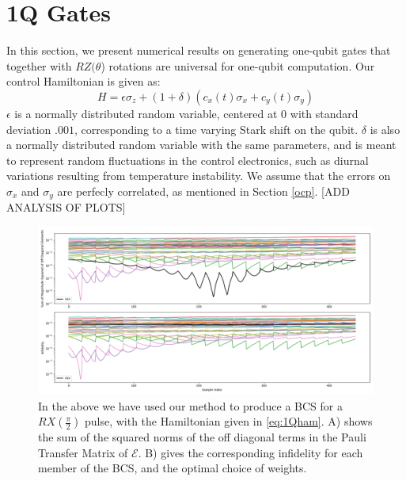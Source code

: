 \documentclass[aps,nofootinbib,pra,notitlepage,twocolumn]{revtex4-1}
\begin{document}
\section{1Q Gates}\label{1Q Gates}
 In this section, we present numerical results on generating one-qubit gates that together with $RZ(\theta$) rotations are universal for one-qubit computation. Our control Hamiltonian is given as: 
\begin{equation}\label{eq:1Qham}
  H = \epsilon\sigma_z + (1 + \delta)(c_x(t)\sigma_x + c_y(t)\sigma_y)
\end{equation}
$\epsilon$ is a normally distributed random variable, centered at $0$ with standard deviation $.001$, corresponding to a time varying Stark shift on the qubit. $\delta$ is also a normally distributed random variable with the same parameters, and is meant to represent random fluctuations in the control electronics, such as diurnal variations resulting from temperature instability. We assume that the errors on $\sigma_x$ and $\sigma_y$ are perfecly correlated, as mentioned in Section \ref{ocp}.
[ADD ANALYSIS OF PLOTS]
\begin{figure}
\centering
\includegraphics[width=\textwidth]{x2.png}
\caption{In the above we have used our method to produce a BCS for a $RX(\frac{\pi}{2})$ pulse, with the Hamiltonian given in \ref{eq:1Qham}. A) shows the sum of the squared norms of the off diagonal terms in the Pauli Transfer Matrix of $\mathcal{E}$. B) gives the corresponding infidelity for each member of the BCS, and the optimal choice of weights.}
\end{figure}
\end{document}
